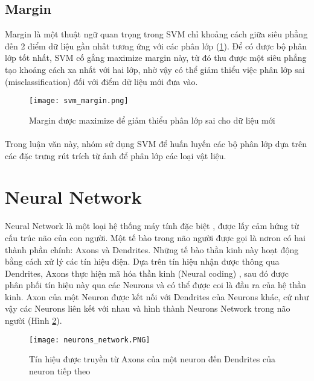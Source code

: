 \subsection*{Margin}
Margin là một thuật ngữ quan trọng trong SVM chỉ khoảng cách giữa siêu phẳng đến 2 điểm dữ liệu gần nhất tương ứng với các phân lớp (\ref{fig:svm_margin}). Để có được bộ phân lớp tốt nhất, SVM cố gắng maximize margin này, từ đó thu được một siêu phẳng tạo khoảng cách xa nhất với hai lớp, nhờ vậy có thể giảm thiểu việc phân lớp sai (misclassification) đối với điểm dữ liệu mới đưa vào.

\begin{figure}[h!]
	\centering
	\captionsetup{width=0.8\textwidth}
	\texttt{[image: svm\_margin.png]}
	\caption{Margin được maximize để giảm thiểu phân lớp sai cho dữ liệu mới}
    \label{fig:svm_margin}
\end{figure}

\paragraph*{}
Trong luận văn này, nhóm sử dụng SVM để huấn luyến các bộ phân lớp dựa trên các đặc trưng rút trích từ ảnh để phân lớp các loại vật liệu.

\section{Neural Network}

Neural Network là một loại hệ thống máy tính đặc biệt \cite{sampson1987parallel}, được lấy cảm hứng từ cấu trúc não của con người. Một tế bào trong não người được gọi là nơron có hai thành phần chính: Axons và Dendrites. Những tế bào thần kinh này hoạt động bằng cách xử lý các tín hiệu điện. Dựa trên tín hiệu nhận được thông qua Dendrites, Axons thực hiện mã hóa thần kinh (Neural coding) \cite{thorpe1990spike}, sau đó được phân phối tín hiệu này qua các Neurons và có thể được coi là đầu ra của hệ thần kinh. Axon của một Neuron được kết nối với Dendrites của Neurons khác, cứ như vậy các Neurons liên kết với nhau và hình thành Neurons Network trong não người (Hình \ref{fig:neuron}).

\begin{figure}[h!]
	\centering
	\captionsetup{width=0.7\textwidth}
	\texttt{[image: neurons\_network.PNG]}
	\caption{Tín hiệu được truyền từ Axons của một neuron đến Dendrites của neuron tiếp theo}
    \label{fig:neuron}
\end{figure}

